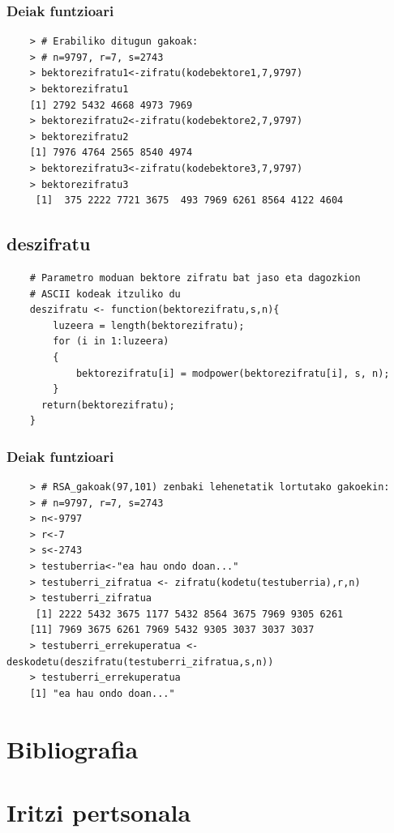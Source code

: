 \documentclass[12pt]{basque-book}
\begin{document}
\subsection{Deiak funtzioari}
\begin{verbatim}
    > # Erabiliko ditugun gakoak:
    > # n=9797, r=7, s=2743
    > bektorezifratu1<-zifratu(kodebektore1,7,9797)
    > bektorezifratu1
    [1] 2792 5432 4668 4973 7969
    > bektorezifratu2<-zifratu(kodebektore2,7,9797)
    > bektorezifratu2
    [1] 7976 4764 2565 8540 4974
    > bektorezifratu3<-zifratu(kodebektore3,7,9797)
    > bektorezifratu3
     [1]  375 2222 7721 3675  493 7969 6261 8564 4122 4604
\end{verbatim}

\newpage

\section{deszifratu}
\begin{verbatim}
    # Parametro moduan bektore zifratu bat jaso eta dagozkion 
    # ASCII kodeak itzuliko du
    deszifratu <- function(bektorezifratu,s,n){
        luzeera = length(bektorezifratu);
        for (i in 1:luzeera)
        {
            bektorezifratu[i] = modpower(bektorezifratu[i], s, n);
        }
      return(bektorezifratu);
    }
\end{verbatim}

\subsection{Deiak funtzioari}
\begin{verbatim}
    > # RSA_gakoak(97,101) zenbaki lehenetatik lortutako gakoekin:
    > # n=9797, r=7, s=2743
    > n<-9797
    > r<-7
    > s<-2743
    > testuberria<-"ea hau ondo doan..."
    > testuberri_zifratua <- zifratu(kodetu(testuberria),r,n)
    > testuberri_zifratua
     [1] 2222 5432 3675 1177 5432 8564 3675 7969 9305 6261
    [11] 7969 3675 6261 7969 5432 9305 3037 3037 3037
    > testuberri_errekuperatua <- deskodetu(deszifratu(testuberri_zifratua,s,n))
    > testuberri_errekuperatua
    [1] "ea hau ondo doan..."
\end{verbatim}

\chapter{Bibliografia}



\chapter{Iritzi pertsonala}
\end{document}
